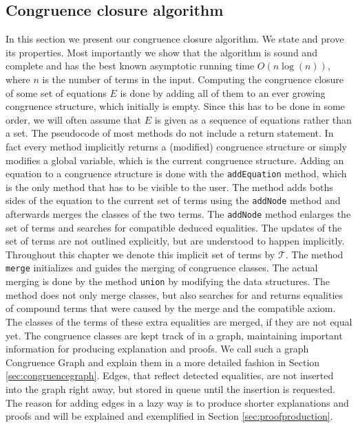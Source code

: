\subsection*{Congruence closure algorithm}
\label{sec:congruenceclosurealgorithm}
In this section we present our congruence closure algorithm.
We state and prove its properties.
Most importantly we show that the algorithm is sound and complete and has the best known asymptotic running time $O(n \log(n))$, where $n$ is the number of terms in the input.
Computing the congruence closure of some set of equations $E$ is done by adding all of them to an ever growing congruence structure, which initially is empty.
Since this has to be done in some order, we will often assume that $E$ is given as a sequence of equations rather than a set.
The pseudocode of most methods do not include a return statement.
In fact every method implicitly returns a (modified) congruence structure or simply modifies a global variable, which is the current congruence structure.
Adding an equation to a congruence structure is done with the \texttt{addEquation} method, which is the only method that has to be visible to the user.
The method adds boths sides of the equation to the current set of terms using the \texttt{addNode} method and afterwards merges the classes of the two terms.
The \texttt{addNode} method enlarges the set of terms and searches for compatible deduced equalities.
The updates of the set of terms are not outlined explicitly, but are understood to happen implicitly.
Throughout this chapter we denote this implicit set of terms by $\mathcal{T}$.
The method \texttt{merge} initializes and guides the merging of congruence classes.
The actual merging is done by the method \texttt{union} by modifying the data structures.
The method does not only merge classes, but also searches for and returns equalities of compound terms that were caused by the merge and the compatible axiom.
The classes of the terms of these extra equalities are merged, if they are not equal yet.
The congruence classes are kept track of in a graph, maintaining important information for producing explanation and proofs.
We call such a graph Congruence Graph and explain them in a more detailed fashion in Section \ref{sec:congruencegraph}.
Edges, that reflect detected equalities, are not inserted into the graph right away, but stored in queue until the insertion is requested.
The reason for adding edges in a lazy way is to produce shorter explanations and proofs and will be explained and exemplified in Section \ref{sec:proofproduction}.

